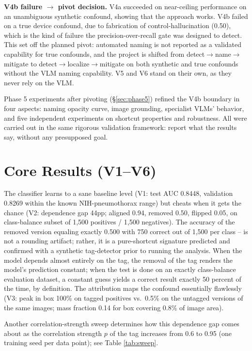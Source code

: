 \documentclass{ieeeaccess}
\begin{document}
\textbf{V4b failure $\rightarrow$ pivot decision.} V4a succeeded on near-ceiling
performance on an unambiguous synthetic confound, showing that the approach works.
V4b failed
on a true device confound, due to fabrication
of control-hallucination (0.50), which is the kind of failure the
precision-over-recall
gate was designed to detect. This set off the planned pivot:
automated naming is not reported as a validated capability for true confounds,
and the project is shifted from detect$\rightarrow$name$\rightarrow$mitigate
to detect$\rightarrow$localize$\rightarrow$mitigate on both synthetic and true confounds without
the VLM naming capability. V5 and V6 stand on their own, as they never rely
on the VLM.

Phase 5 experiments after pivoting (\S\ref{sec:phase5}) refined the
V4b boundary in four aspects: naming opacity curve, image grounding,
specialist VLMs’ behavior, and five independent experiments on shortcut
properties and robustness. All were carried out in the same rigorous
validation framework: report what the results say, without any presupposed
goal.

\section{Core Results (V1--V6)}
\label{sec:results}
The classifier learns to a sane baseline level (V1: test AUC 0.8448,
validation 0.8269  within the known NIH-pneumothorax range) but cheats
when it gets the chance (V2: dependence gap 44pp; aligned 0.94, removed
0.50, flipped 0.05, on class-balance subset of 1,500 positives / 1,500
negatives). The accuracy of the removed version equaling exactly 0.500
with 750 correct out of 1,500 per class – is not a rounding artifact;
rather, it is a pure-shortcut signature predicted and confirmed with a
synthetic tag-detector prior to running the analysis. When the model
depends almost entirely on the tag, the removal of the tag renders the
model's prediction constant; when the test is done on an exactly
class-balance evaluation dataset, a constant guess yields a correct result
exactly 50 percent of the time, by definition. The attribution maps the
confound essentially flawlessly (V3: peak in box 100\% on tagged positives
vs.\ 0.5\% on the untagged versions of the same images; mass fraction
0.14 for box covering 0.8\% of image area).

Another correlation-strength sweep determines how this dependence gap comes about as the correlation strength $p$ of the tag increases from 0.6 to 0.95 (one training seed per data point); see Table \ref{tab:sweep}.
\end{document}

